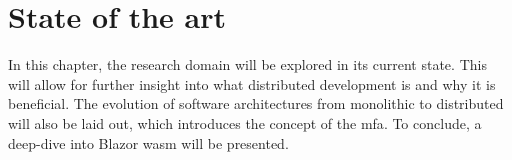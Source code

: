 
\chapter{State of the art}
\label{ch:state-of-the-art}





In this chapter, the research domain will be explored in its current state. This
will allow for further insight into what distributed development is and why it
is beneficial. The evolution of software architectures from monolithic to
distributed will also be laid out, which introduces the concept of
the \gls{mfa}. To conclude, a deep-dive into Blazor \Gls{wasm} will be presented.

\newpage
\newpage
\newpage

